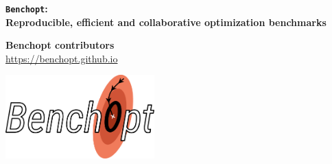 \documentclass[unknownkeysallowed]{beamer}
\begin{document}


\begin{frame}
\bigskip
\bigskip
\begin{center}{
\LARGE\color{marron}
\textbf{\texttt{Benchopt}:\\
Reproducible, efficient and collaborative optimization benchmarks}
\textbf{ }\\
}

\color{marron}
\end{center}

\vspace{0.5cm}

\begin{center}
\textbf{Benchopt contributors} \\
\vspace{0.1cm}
\url{https://benchopt.github.io}\\
\end{center}

\centering
\includegraphics[width=0.43\textwidth]{benchopt_logo.pdf}

\end{frame}
\end{document}
